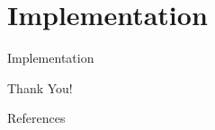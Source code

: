 \section{Implementation}
\begin{frame}[plain,t]{Implementation} %
    \vspace{2ex}
    
    
    
\end{frame}




\begin{frame}[plain]
    \huge
    \vfill
    \centerline{  }
    \vfill
    
\end{frame}
\begin{frame}[plain]
    \huge
    \vfill
    \centerline{  }
    \vfill
    \Huge
    \centerline{\alert{Thank You!} }
    \vfill
\end{frame}

\begin{frame}{References}
\end{frame}  
 
%	

